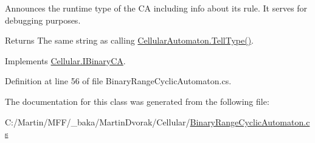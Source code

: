 Announces the runtime type of the C\+A including info about its rule. It serves for debugging purposes. 

\begin{DoxyReturn}{Returns}
The same string as calling {\ttfamily \hyperlink{class_cellular_1_1_cellular_automaton_abe4b92fd405530c8a08cc07a3a19fff4}{Cellular\+Automaton.\+Tell\+Type()}}.
\end{DoxyReturn}


Implements \hyperlink{interface_cellular_1_1_i_binary_c_a_aa67feabf5d1513aa74076d255c661948}{Cellular.\+I\+Binary\+C\+A}.



Definition at line 56 of file Binary\+Range\+Cyclic\+Automaton.\+cs.



The documentation for this class was generated from the following file\+:\begin{DoxyCompactItemize}
\item 
C\+:/\+Martin/\+M\+F\+F/\+\_\+baka/\+Martin\+Dvorak/\+Cellular/\hyperlink{_binary_range_cyclic_automaton_8cs}{Binary\+Range\+Cyclic\+Automaton.\+cs}\end{DoxyCompactItemize}
